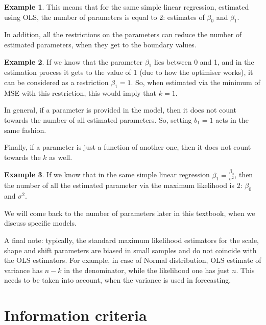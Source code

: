 \documentclass[
]{book}
\theoremstyle{definition}
\theoremstyle{definition}
\newtheorem{example}{Example}[chapter]
\theoremstyle{definition}
\theoremstyle{definition}
\theoremstyle{remark}
\begin{document}
\begin{example}
\protect\hypertarget{exm:unnamed-chunk-106}{}\label{exm:unnamed-chunk-106}This means that for the same simple linear regression, estimated using OLS, the number of parameters is equal to 2: estimates of \(\beta_0\) and \(\beta_1\).
\end{example}

In addition, all the restrictions on the parameters can reduce the number of estimated parameters, when they get to the boundary values.

\begin{example}
\protect\hypertarget{exm:unnamed-chunk-107}{}\label{exm:unnamed-chunk-107}If we know that the parameter \(\beta_1\) lies between 0 and 1, and in the estimation process it gets to the value of 1 (due to how the optimiser works), it can be considered as a restriction \(\beta_1=1\). So, when estimated via the minimum of MSE with this restriction, this would imply that \(k=1\).
\end{example}

In general, if a parameter is provided in the model, then it does not count towards the number of all estimated parameters. So, setting \(b_1=1\) acts in the same fashion.

Finally, if a parameter is just a function of another one, then it does not count towards the \(k\) as well.

\begin{example}
\protect\hypertarget{exm:unnamed-chunk-108}{}\label{exm:unnamed-chunk-108}If we know that in the same simple linear regression \(\beta_1 = \frac{\beta_0}{\sigma^2}\), then the number of all the estimated parameter via the maximum likelihood is 2: \(\beta_0\) and \(\sigma^2\).
\end{example}

We will come back to the number of parameters later in this textbook, when we discuss specific models.

A final note: typically, the standard maximum likelihood estimators for the scale, shape and shift parameters are biased in small samples and do not coincide with the OLS estimators. For example, in case of Normal distribution, OLS estimate of variance has \(n-k\) in the denominator, while the likelihood one has just \(n\). This needs to be taken into account, when the variance is used in forecasting.

\hypertarget{informationCriteria}{%
\section{Information criteria}\label{informationCriteria}}
\end{document}
